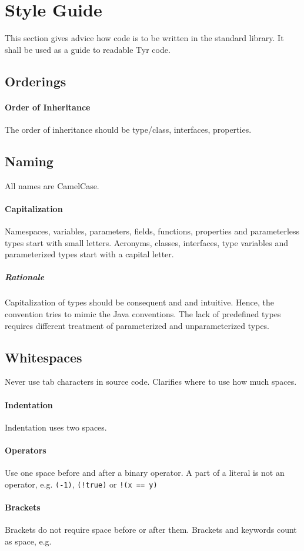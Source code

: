 \section{Style Guide}

This section gives advice how code is to be written in the standard library.
It shall be used as a guide to readable Tyr code.

\subsection{Orderings}

\paragraph{Order of Inheritance}
The order of inheritance should be type/class, interfaces, properties.


\subsection{Naming}

All names are CamelCase.

\paragraph{Capitalization}

Namespaces, variables, parameters, fields, functions, properties and parameterless types start with small letters.
Acronyms, classes, interfaces, type variables and parameterized types start with a capital letter.

\subparagraph{Rationale}
Capitalization of types should be consequent and and intuitive.
Hence, the convention tries to mimic the Java conventions.
The lack of predefined types requires different treatment of parameterized and unparameterized types.

\subsection{Whitespaces}
Never use tab characters in source code.
Clarifies where to use how much spaces.

\paragraph{Indentation}
Indentation uses two spaces.

\paragraph{Operators}
Use one space before and after a binary operator.
A part of a literal is not an operator, e.g. \verb+(-1)+, \verb+(!true)+ or \verb+!(x == y)+

\paragraph{Brackets}
Brackets do not require space before or after them.
Brackets and keywords count as space, e.g. 